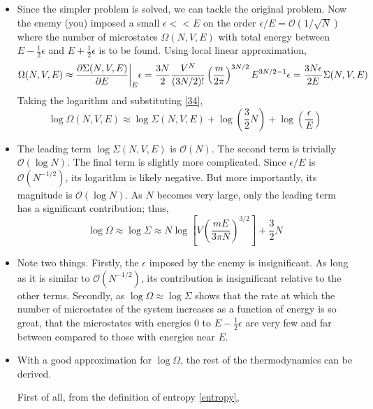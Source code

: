 \documentclass{article}
\begin{document}
\begin{itemize}
\begin{equation}
    \end{equation}
    \item Since the simpler problem is solved, we can tackle the original problem. Now the enemy (you) imposed a small $\epsilon<<E$ on the order $\epsilon/E=\mathcal{O}(1/\sqrt{N})$ where the number of microstates $\Omega(N,V,E)$ with total energy between $E-\frac{1}{2}\epsilon$ and $E+\frac{1}{2}\epsilon$ is to be found. Using local linear approximation,
    \begin{equation}
        \Omega(N,V,E)\approx\partialderivative{\Sigma(N,V,E)}{E}\bigg|_{E}\epsilon=\frac{3N}{2}\frac{V^N}{(3N/2)!}\left(\frac{m}{2\pi}\right)^{3N/2}E^{3N/2-1}\epsilon=\frac{3N\epsilon}{2E}\Sigma(N,V,E)
    \end{equation}
    Taking the logarithm and substituting \eqref{34},\begin{equation}
        \log\Omega(N,V,E)\approx \log\Sigma(N,V,E)+\log\left(\frac{3}{2}N\right)+\log(\frac{\epsilon}{E})
    \end{equation}
    \item The leading term $\log\Sigma(N,V,E)$ is $\mathcal{O}(N)$. The second term is trivially $\mathcal{O}(\log N)$. The final term is slightly more complicated. Since $\epsilon/E$ is $\mathcal{O}(N^{-1/2})$, its logarithm is likely negative. But more importantly, its magnitude is $\mathcal{O}(\log N)$. As $N$ becomes very large, only the leading term has a significant contribution; thus, \begin{equation}
        \log\Omega\approx\log\Sigma\approx N\log\left[V\left(\frac{mE}{3\pi N}\right)^{3/2}\right]+\frac{3}{2}N\label{37}
    \end{equation}
    \item Note two things. Firstly, the $\epsilon$ imposed by the enemy is insignificant. As long as it is similar to $\mathcal{O}(N^{-1/2})$, its contribution is insignificant relative to the other terms. Secondly, as $\log\Omega\approx\log\Sigma$ shows that the rate at which the number of microstates of the system increases as a function of energy is so great, that the microstates with energies $0$ to $E-\frac{1}{2}\epsilon$ are very few and far between compared to those with energies near $E$.
    \item With a good approximation for $\log\Omega$, the rest of the thermodynamics can be derived.
    \begin{derivation}
        First of all, from the definition of entropy \eqref{entropy},
        \begin{equation}

\end{equation}
\end{derivation}
\end{itemize}
\end{document}
